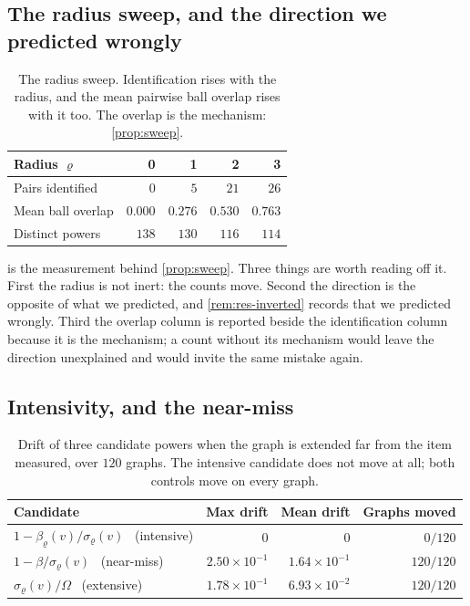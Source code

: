 \documentclass[11pt,twocolumn,a4paper]{article}
\theoremstyle{plain}
\theoremstyle{definition}
\theoremstyle{remark}
\newcommand{\flo}{\beta}
\newcommand{\sepc}{\sigma}
\newcommand{\Tot}{\Omega}
\newcommand{\rad}{\varrho}
\begin{document}
\subsection{The radius sweep, and the direction we predicted wrongly}

\begin{table}[!htbp]
\centering
\caption{The radius sweep. Identification rises with the radius, and the mean
pairwise ball overlap rises with it too. The overlap is the mechanism:
\cref{prop:sweep}.}
\label{tab:sweep}
\begin{tabular}{lrrrr}
\toprule
Radius $\rad$ & 0 & 1 & 2 & 3 \\
\midrule
Pairs identified            & $0$   & $5$   & $21$  & $26$ \\
Mean ball overlap           & $0.000$ & $0.276$ & $0.530$ & $0.763$ \\
Distinct powers             & $138$ & $130$ & $116$ & $114$ \\
\bottomrule
\end{tabular}
\end{table}

 is the measurement behind \cref{prop:sweep}. Three things are
worth reading off it. First the radius is not inert: the counts move. Second
the direction is the opposite of what we predicted, and \cref{rem:res-inverted}
records that we predicted wrongly. Third the overlap column is reported beside
the identification column because it is the mechanism; a count without its
mechanism would leave the direction unexplained and would invite the same
mistake again.

\subsection{Intensivity, and the near-miss}

\begin{table}[!htbp]
\centering
\caption{Drift of three candidate powers when the graph is extended far from
the item measured, over $120$ graphs. The intensive candidate does not move at
all; both controls move on every graph.}
\label{tab:intensivity}
\begin{tabular}{lrrr}
\toprule
Candidate & Max drift & Mean drift & Graphs moved \\
\midrule
$1-\flo_\rad(v)/\sepc_\rad(v)$ \ (intensive)      & $0$ & $0$ & $0/120$ \\
$1-\flo/\sepc_\rad(v)$ \ (near-miss)              & $2.50\times10^{-1}$ & $1.64\times10^{-1}$ & $120/120$ \\
$\sepc_\rad(v)/\Tot$ \ (extensive)                & $1.78\times10^{-1}$ & $6.93\times10^{-2}$ & $120/120$ \\
\bottomrule
\end{tabular}
\end{table}
\end{document}

